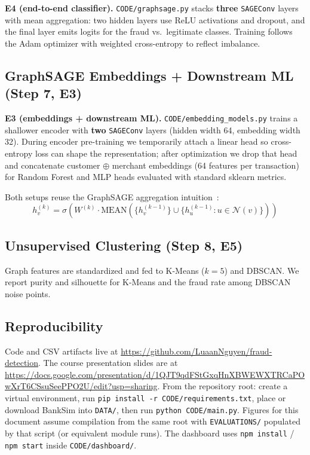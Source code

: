 \documentclass[conference]{IEEEtran}
\begin{document}
\textbf{E4 (end-to-end classifier).} \texttt{CODE/graphsage.py} stacks \textbf{three} \texttt{SAGEConv} layers with mean aggregation: two hidden layers use ReLU activations and dropout, and the final layer emits logits for the fraud vs.\ legitimate classes. Training follows the Adam optimizer with weighted cross-entropy to reflect imbalance.

\subsection{GraphSAGE Embeddings + Downstream ML (Step 7, E3)}

\textbf{E3 (embeddings + downstream ML).} \texttt{CODE/embedding\_models.py} trains a shallower encoder with \textbf{two} \texttt{SAGEConv} layers (hidden width 64, embedding width 32). During encoder pre-training we temporarily attach a linear head so cross-entropy loss can shape the representation; after optimization we drop that head and concatenate customer $\oplus$ merchant embeddings (64 features per transaction) for Random Forest and MLP heads evaluated with standard sklearn metrics.

Both setups reuse the GraphSAGE aggregation intuition~\cite{b6}:
\begin{equation}
h_v^{(k)} = \sigma\!\left(W^{(k)} \cdot \mathrm{MEAN}\!\left(\{h_v^{(k-1)}\} \cup \{h_u^{(k-1)} : u \in \mathcal{N}(v)\}\right)\right)
\end{equation}

\subsection{Unsupervised Clustering (Step 8, E5)}

Graph features are standardized and fed to K-Means ($k{=}5$) and DBSCAN. We report purity and silhouette for K-Means and the fraud rate among DBSCAN noise points.

\subsection{Reproducibility}
\label{sec:repro}
Code and CSV artifacts live at \url{https://github.com/LuaanNguyen/fraud-detection}. The course presentation slides are at \url{https://docs.google.com/presentation/d/1QJT9qdFStGxqHnXBWEWXTRCaPOwXrT6CSsuSeePPO2U/edit?usp=sharing}. From the repository root: create a virtual environment, run \texttt{pip install -r CODE/requirements.txt}, place or download BankSim into \texttt{DATA/}, then run \texttt{python CODE/main.py}. Figures for this document assume compilation from the same root with \texttt{EVALUATIONS/} populated by that script (or equivalent module runs). The dashboard uses \texttt{npm install} / \texttt{npm start} inside \texttt{CODE/dashboard/}.
\end{document}
